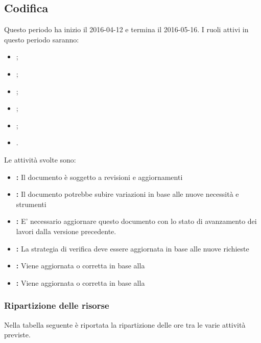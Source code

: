 \documentclass[12pt,a4paper]{article}
\begin{document}
\newpage
\subsection{Codifica}
Questo periodo ha inizio il 2016-04-12 e termina il 2016-05-16. I ruoli attivi in questo periodo saranno:
\begin{itemize}
	\item \PM{};
	\item \AM{};
	\item \AN{};
	\item \PR{};
	\item \PG{};
	\item \VR{}.
\end{itemize}

Le attività svolte sono:
\begin{itemize}
	\item \textbf{\AdR{}:} 
	Il documento è soggetto a revisioni e aggiornamenti
	\item \textbf{\NdP{}:}
	Il documento potrebbe subire variazioni in base alle nuove necessità e strumenti
	\item \textbf{\PdP{}:}
	E' necessario aggiornare questo documento con lo stato di avanzamento dei lavori dalla versione precedente.
	\item \textbf{\PdQ{}:}
	La strategia di verifica deve essere aggiornata in base alle nuove richieste
	\item \textbf{\ST{}:}
	Viene aggiornata o corretta in base alla \RP{}
	\item \textbf{\DP{}:} 
	Viene aggiornata o corretta in base alla \RP{}
\end{itemize}

\newpage
\subsubsection{Ripartizione delle risorse}
Nella tabella seguente è riportata la ripartizione delle ore tra le varie attività previste.
\end{document}
